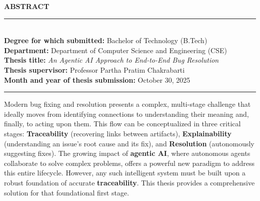 \begin{center}
    {\Large\textbf{ABSTRACT}}\\[0.2in]
\end{center}

\noindent
\rule{\textwidth}{0.4pt}\\[6pt]
\textbf{Degree for which submitted:} Bachelor of Technology (B.Tech)\\
\textbf{Department:} Department of Computer Science and Engineering (CSE)\\
\textbf{Thesis title:} \textit{An Agentic AI Approach to End-to-End Bug Resolution}\\
\textbf{Thesis supervisor:} Professor Partha Pratim Chakrabarti\\
\textbf{Month and year of thesis submission:} October 30, 2025\\[6pt]
\rule{\textwidth}{0.4pt}

\vspace{0.2in}

\noindent
Modern bug fixing and resolution presents a complex, multi-stage challenge that ideally moves from identifying connections to understanding their meaning and, finally, to acting upon them. This flow can be conceptualized in three critical stages: \textbf{Traceability} (recovering links between artifacts), \textbf{Explainability} (understanding an issue's root cause and its fix), and \textbf{Resolution} (autonomously suggesting fixes). The growing impact of \textbf{agentic AI}, where autonomous agents collaborate to solve complex problems, offers a powerful new paradigm to address this entire lifecycle. However, any such intelligent system must be built upon a robust foundation of accurate \textbf{traceability}. This thesis provides a comprehensive solution for that foundational first stage.\\

